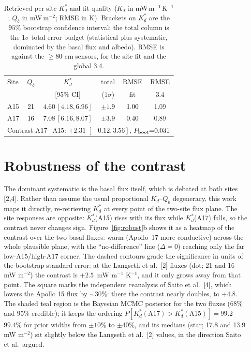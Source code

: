 \documentclass[10pt,a4paper,twocolumn]{article}
\begin{document}
\begin{table}[tbp]
\centering
\caption{Retrieved per-site $K_d^{*}$ and fit quality ($K_d$ in
mW\,m$^{-1}$\,K$^{-1}$; $Q_b$ in mW\,m$^{-2}$; RMSE in K). Brackets on
$K_d^{*}$ are the $95\%$ bootstrap confidence interval; the total
column is the $1\sigma$ total error budget (statistical plus
systematic, dominated by the basal flux and albedo). RMSE is against
the $\geq 80$ cm sensors, for the site fit and the global $3.4$.}
\label{tab:results}
\vspace{1pt}
{\footnotesize\setlength{\tabcolsep}{3.5pt}\renewcommand{\arraystretch}{1.45}
\begin{tabular}{lccccc}
\hline
Site & $Q_b$ & $K_d^{*}$ & total & RMSE & RMSE \\
     &       & [95\% CI] & ($1\sigma$) & fit  & 3.4  \\
\hline
A15 & 21 & $4.60\,[4.18, 6.96]$ & $\pm1.9$ & 1.00 & 1.09 \\
A17 & 16 & $7.08\,[6.16, 8.07]$ & $\pm3.9$ & 0.40 & 0.89 \\
\hline
\multicolumn{6}{l}{Contrast A17$-$A15: $+2.31$ $[-0.12, 3.56]$,
$P_{\rm boot}{=}0.031$}\\
\hline
\end{tabular}}
\end{table}

\section{Robustness of the contrast}
The dominant systematic is the basal flux itself, which is debated at
both sites [2,4]. Rather than assume the usual proportional
$K_d$--$Q_b$ degeneracy, this work maps it directly, re-retrieving
$K_d^{*}$ at every point of the two-site flux plane. The site responses are
opposite: $K_d^{*}$(A15) rises with its flux while $K_d^{*}$(A17)
falls, so the contrast never changes sign. Figure~\ref{fig:robust}b
shows it as a heatmap of the contrast over the two basal fluxes: warm
(Apollo~17 more conductive) across the whole plausible plane, with the
``no-difference'' line ($\Delta = 0$) reaching only the far
low-A15/high-A17 corner. The dashed contours grade the significance in
units of the bootstrap standard error: at the Langseth et al.\ [2]
fluxes (dot; 21 and 16 mW m$^{-2}$) the contrast is $+2.5$~mW m$^{-1}$ K$^{-1}$, and it only grows away from
that point. The square marks
the independent reanalysis of Saito et al.\ [4], which lowers the
Apollo 15 flux by ${\sim}30\%$: there the contrast nearly doubles,
to $+4.8$. The shaded teal region is the Bayesian MCMC posterior for
the two fluxes (68\% and 95\% credible); it keeps the ordering
$P[K_d^{*}(\mathrm{A17}) > K_d^{*}(\mathrm{A15})] = 99.2$--$99.4\%$ for
prior widths from $\pm 10\%$ to $\pm 40\%$, and its medians (star; 17.8 and
13.9 mW m$^{-2}$) sit slightly below the Langseth et al.\ [2] values,
in the direction Saito et al.\ argued.
\end{document}
